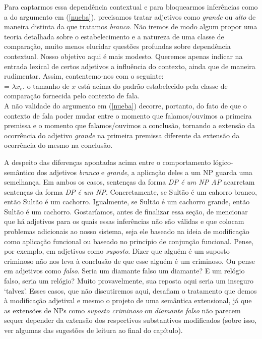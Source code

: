 Para captarmos essa dependência contextual e para bloquearmos
inferências como a do argumento em (\ref{nueba}), precisamos tratar adjetivos
como \textit{grande} ou \textit{alto} de maneira distinta da que
tratamos \textit{branco}. Não iremos
de modo algum propor uma teoria detalhada sobre o estabelecimento
e a natureza de uma classe de comparação, muito menos elucidar
questões profundas sobre dependência contextual. Nosso objetivo
aqui é mais modesto. Queremos apenas indicar na entrada lexical de
certos adjetivos a influência do contexto, ainda que de maneira
rudimentar. Assim, contentemo-nos com o seguinte:\\

\n {} = $\lambda x_{e}.$ o
tamanho de $x$ está acima do padrão estabelecido pela
classe de comparação fornecida pelo contexto de fala.\\

\n A não validade do argumento em (\ref{nueba}) decorre, portanto, do fato de
que o contexto de fala poder mudar entre o momento que falamos/ouvimos a
primeira premissa e o momento que falamos/ouvimos a conclusão,
tornando a extensão da ocorrência do adjetivo \textit{grande} na
primeira premissa diferente da extensão da ocorrência do mesmo na
conclusão.

A despeito das diferenças apontadas acima entre o comportamento lógico-semântico dos adjetivos \textit{branco} e \textit{grande}, a aplicação deles a um NP guarda uma semelhança. Em ambos os casos, sentenças da forma \textit{DP é um NP AP} acarretam sentenças da forma \textit{DP é um NP}. Concretamente, se Sultão é um cahorro branco, então Sultão é um cachorro. Igualmente, se Sultão é um cachorro grande, então Sultão é um cachorro. Gostaríamos, antes de finalizar essa seção, de mencionar que há adjetivos para os quais essas inferências não são válidas e que colocam problemas adicionais ao nosso sistema, seja ele baseado na ideia de modificação como aplicação funcional ou baseado no princípio de conjunção funcional. Pense, por exemplo, em adjetivos como \textit{suposto}. Dizer que alguém é um suposto criminoso não nos leva à conclusão de que esse alguém é um criminoso. Ou pense em adjetivos como \textit{falso}. Seria um diamante falso um diamante? E um relógio falso, seria um relógio? Muito provavelmente, sua reposta aqui seria um inseguro `talvez'. Esses casos, que não discutiremos aqui, desafiam o tratamento que demos à modificação adjetival e mesmo o projeto de uma semântica extensional, já que as extensões de NPs como \textit{suposto criminoso} ou \textit{diamante falso} não parecem sequer depender da extensão dos respectivos substantivos modificados (sobre isso, ver algumas das sugestões de leitura ao final do capítulo).  

